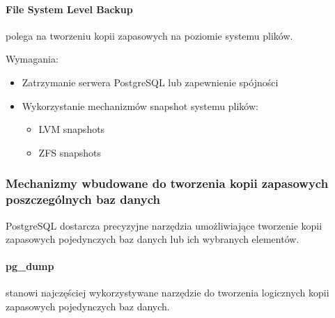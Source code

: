 \documentclass[letterpaper,10pt,polish]{sphinxmanual}
\begin{document}
\paragraph{File System Level Backup}
\label{\detokenize{rozdzial2/Kopie_zapasowe_i_odzyskiwanie_danych/kopie_zapasowe_i_odzyskiwanie_danych:file-system-level-backup}}
\sphinxAtStartPar
{} polega na tworzeniu kopii zapasowych na poziomie systemu plików.

\sphinxAtStartPar
Wymagania:
\begin{itemize}
\item {} 
\sphinxAtStartPar
Zatrzymanie serwera PostgreSQL lub zapewnienie spójności

\item {} 
\sphinxAtStartPar
Wykorzystanie mechanizmów snapshot systemu plików:
\begin{itemize}
\item {} 
\sphinxAtStartPar
LVM snapshots

\item {} 
\sphinxAtStartPar
ZFS snapshots

\end{itemize}

\end{itemize}


\subsubsection{Mechanizmy wbudowane do tworzenia kopii zapasowych poszczególnych baz danych}
\label{\detokenize{rozdzial2/Kopie_zapasowe_i_odzyskiwanie_danych/kopie_zapasowe_i_odzyskiwanie_danych:mechanizmy-wbudowane-do-tworzenia-kopii-zapasowych-poszczegolnych-baz-danych}}
\sphinxAtStartPar
PostgreSQL dostarcza precyzyjne narzędzia umożliwiające tworzenie kopii zapasowych pojedynczych baz danych lub ich wybranych elementów.


\paragraph{pg\_dump}
\label{\detokenize{rozdzial2/Kopie_zapasowe_i_odzyskiwanie_danych/kopie_zapasowe_i_odzyskiwanie_danych:pg-dump}}
\sphinxAtStartPar
{} stanowi najczęściej wykorzystywane narzędzie do tworzenia logicznych kopii zapasowych pojedynczych baz danych.
\end{document}
